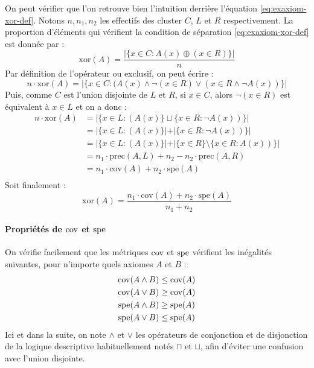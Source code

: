 On peut vérifier que l'on retrouve bien l'intuition derrière l'équation \ref{eq:exaxiom-xor-def}. Notons $n, n_1, n_2$ les effectifs des cluster $C$, $L$ et $R$ respectivement. La proportion d'éléments qui vérifient la condition de séparation \ref{eq:exaxiom-xor-def} est donnée par :
\begin{equation}
    \text{xor}(A) = \frac{| \{x \in C : A(x) \oplus (x \in R) \}|}{n}
\end{equation}
Par définition de l'opérateur ou exclusif, on peut écrire :
\begin{equation}
    n \cdot \text{xor}(A) = |\{x \in C: (A(x) \land \neg (x \in R) \lor (x \in R \land \neg A(x)) \}|
\end{equation}
Puis, comme $C$ est l'union disjointe de $L$ et $R$, si $x \in C$, alors $\neg (x \in R)$ est équivalent à $x \in L$ et on a donc :
\begin{align*}
    n \cdot \text{xor}(A) &= |\{x \in L: (A(x)\} \sqcup \{x \in R : \neg A(x)) \}| \\
    &= |\{x \in L: (A(x)\} | + | \{x \in R : \neg A(x)) \}|  \\
    &= |\{x \in L: (A(x)\} | + | \{x \in R \} \setminus \{x \in R : A(x)) \}| \\
    &= n_1 \cdot \text{prec}(A, L) + n_2 - n_2 \cdot \text{prec}(A, R) \\
    &= n_1 \cdot \text{cov}(A) + n_2 \cdot \text{spe}(A) \\
\end{align*}
Soit finalement :
\begin{equation}
    \text{xor}(A) = \frac{n_1 \cdot \text{cov}(A) + n_2 \cdot \text{spe}(A)}{n_1 + n_2}
\end{equation}

\paragraph{Propriétés de $\operatorname{cov}$ et $\operatorname{spe}$}

On vérifie facilement que les métriques $\operatorname{cov}$ et $\operatorname{spe}$ vérifient les inégalités suivantes, pour n'importe quels axiomes $A$ et $B$ :
\begin{align}
    \operatorname{cov}(A \land B) & \leq \operatorname{cov}(A) \\
    \operatorname{cov}(A \lor B) & \geq \operatorname{cov}(A)  \label{eq:cov-disjunct} \\
    \operatorname{spe}(A \land B) & \geq \operatorname{spe}(A) \label{eq:cov-conjunct} \\
    \operatorname{spe}(A \lor B) & \leq \operatorname{spe}(A)
\end{align}
Ici et dans la suite, on note $\land$ et $\lor$ les opérateurs de conjonction et de disjonction de la logique descriptive habituellement notés $\sqcap$ et $\sqcup$, afin d'éviter une confusion avec l'union disjointe.


